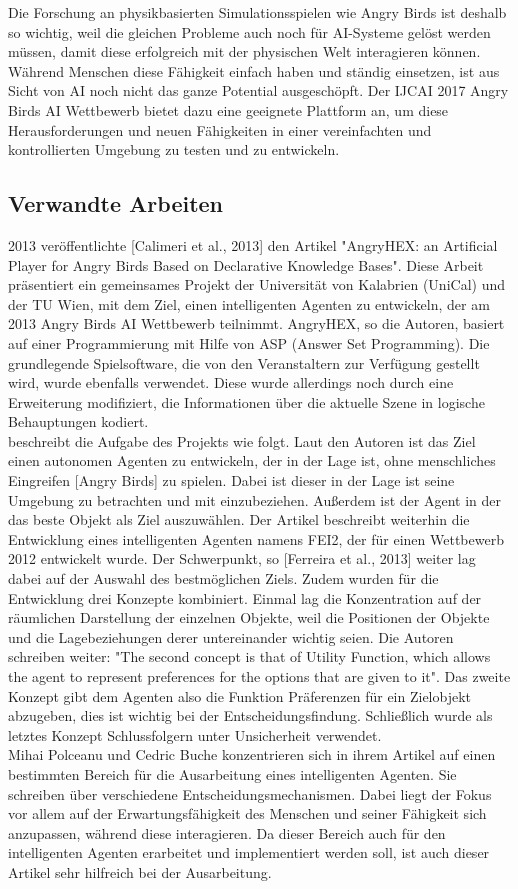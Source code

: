 Die Forschung an physikbasierten Simulationsspielen wie Angry Birds ist deshalb so wichtig, weil die gleichen Probleme auch noch für AI-Systeme gelöst werden müssen, damit diese erfolgreich mit der physischen Welt interagieren können. Während Menschen diese Fähigkeit einfach haben und ständig einsetzen, ist aus Sicht von AI noch nicht das ganze Potential ausgeschöpft. Der IJCAI 2017 Angry Birds AI Wettbewerb bietet dazu eine geeignete Plattform an, um diese Herausforderungen und neuen Fähigkeiten in einer vereinfachten und kontrollierten Umgebung zu testen und zu entwickeln.

\subsection{Verwandte Arbeiten}
2013 veröffentlichte [Calimeri et al., 2013] den Artikel "AngryHEX: an Artificial Player for Angry Birds Based on Declarative Knowledge Bases". Diese Arbeit präsentiert ein gemeinsames Projekt der Universität von Kalabrien (UniCal) und der TU Wien, mit dem Ziel, einen intelligenten Agenten zu entwickeln, der am 2013 Angry Birds AI Wettbewerb teilnimmt. AngryHEX, so die Autoren, basiert auf einer Programmierung mit Hilfe von ASP (Answer Set Programming). Die grundlegende Spielsoftware, die von den Veranstaltern zur Verfügung gestellt wird, wurde ebenfalls verwendet. Diese wurde allerdings noch durch eine Erweiterung modifiziert, die Informationen über die aktuelle Szene in logische Behauptungen kodiert.\\
[Ferreira et al., 2013] beschreibt die Aufgabe des Projekts wie folgt. Laut den Autoren ist das Ziel einen autonomen Agenten zu entwickeln, der in der Lage ist, ohne menschliches Eingreifen [Angry Birds] zu spielen. Dabei ist dieser in der Lage ist seine Umgebung zu betrachten und mit einzubeziehen. Außerdem ist der Agent in der das beste Objekt als Ziel auszuwählen. Der Artikel beschreibt weiterhin die Entwicklung eines intelligenten Agenten namens FEI2, der für einen Wettbewerb 2012 entwickelt wurde. Der Schwerpunkt, so [Ferreira et al., 2013] weiter lag dabei auf der Auswahl des bestmöglichen Ziels. Zudem wurden für die Entwicklung drei Konzepte kombiniert. Einmal lag die Konzentration auf der räumlichen Darstellung der einzelnen Objekte, weil die Positionen der Objekte und die Lagebeziehungen derer untereinander wichtig seien. Die Autoren schreiben weiter: "The second concept is that of Utility Function, which allows the agent to represent preferences for the options that are given to it". Das zweite Konzept gibt dem Agenten also die Funktion Präferenzen für ein Zielobjekt abzugeben, dies ist wichtig bei der Entscheidungsfindung. Schließlich wurde als letztes Konzept Schlussfolgern unter Unsicherheit verwendet.\\
Mihai Polceanu und Cedric Buche konzentrieren sich in ihrem Artikel auf einen bestimmten Bereich für die Ausarbeitung eines intelligenten Agenten. Sie schreiben über verschiedene Entscheidungsmechanismen. Dabei liegt der Fokus vor allem auf der Erwartungsfähigkeit des Menschen und seiner Fähigkeit sich anzupassen, während diese interagieren. Da dieser Bereich auch für den intelligenten Agenten erarbeitet und implementiert werden soll, ist auch dieser Artikel sehr hilfreich bei der Ausarbeitung.

